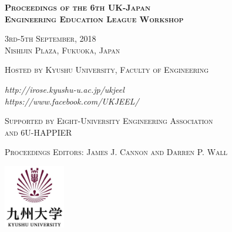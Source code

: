 \begin{titlepage}
\centering
	{\scshape\LARGE\bfseries Proceedings of the 6th  UK-Japan \\
              Engineering Education League Workshop \par}
	\vspace{1cm}
	{\scshape\Large 3rd-5th September, 2018\\
               Nishijin Plaza, Fukuoka, Japan \par}
	\vspace{1.5cm}
	{\scshape\large Hosted by Kyushu University, Faculty of Engineering \par}
	\vspace{1.5cm}
	{\large\itshape {http://irose.kyushu-u.ac.jp/ukjeel} \\
                {https://www.facebook.com/UKJEEL/}  \par}
	\vfill
	 
	{\scshape\large  Supported by Eight-University Engineering Association \\
          and 6U-HAPPIER \par }
\vspace{0.25cm}
{\scshape Proceedings Editors:  James J. Cannon  and Darren P. Wall \par }
\vspace{0.5cm}
\includegraphics[width=0.2\textwidth]{kyushu_log.jpg}\par\vspace{1cm}
\end{titlepage}

 
